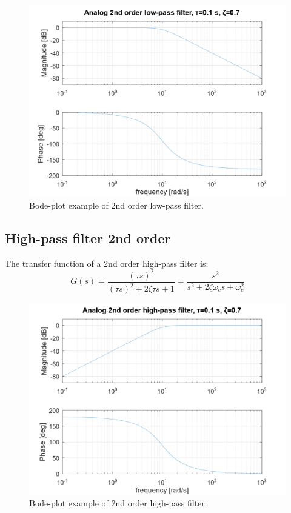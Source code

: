\documentclass[]{book}
\begin{document}
\begin{figure}
\includegraphics[width=1\linewidth]{images/filters/lpf_2nd} \caption{Bode-plot example of 2nd order low-pass filter.}\label{fig:unnamed-chunk-3}
\end{figure}

\hypertarget{high-pass-filter-2nd-order}{%
\subsection{High-pass filter 2nd order}\label{high-pass-filter-2nd-order}}

The transfer function of a 2nd order high-pass filter is:
\[
G(s) =  \frac{(\tau s)^2}{(\tau s)^2 + 2\zeta \tau s + 1} = \frac{s^2}{s^2 + 2\zeta \omega_c s + \omega_c^2}
\label{eq:hpf2}
\]

\begin{figure}
\includegraphics[width=1\linewidth]{images/filters/hpf_2nd} \caption{Bode-plot example of 2nd order high-pass filter.}\label{fig:unnamed-chunk-4}
\end{figure}
\end{document}
